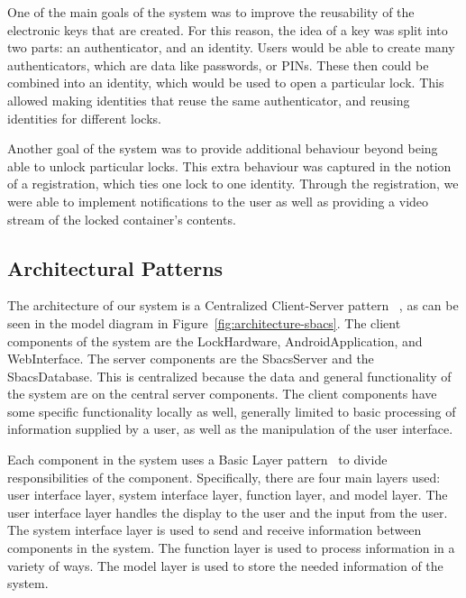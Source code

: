\documentclass[12pt]{report}
\let\Oldsubsection\subsection
\renewcommand{\subsection}{\FloatBarrier\Oldsubsection}
\begin{document}
One of the main goals of the system was to improve the reusability of the electronic keys that are created. For this
reason, the idea of a key was split into two parts: an authenticator, and an identity. Users would be able to create
many authenticators, which are data like passwords, or PINs. These then could be combined into an identity, which
would be used to open a particular lock. This allowed making identities that reuse the same authenticator, and reusing
identities for different locks.

Another goal of the system was to provide additional behaviour beyond being able to unlock particular locks.
This extra behaviour was captured in the notion of a registration, which ties one lock to one identity. Through the
registration, we were able to implement notifications to the user as well as providing a video stream of the locked 
container's contents.


\subsection{Architectural Patterns} \label{architectural-patterns}

The architecture of our system is a Centralized Client-Server pattern ~\autocite{CLIENTSERVERARCH}, as can be seen 
in the model diagram in Figure~\ref{fig:architecture-sbacs}. The client components of
the system are the LockHardware, AndroidApplication, and WebInterface. The server components are the SbacsServer and
the SbacsDatabase. This is centralized because the data and general functionality of the system are on the central
server components. The client components have some specific functionality locally as well, generally limited to
basic processing of information supplied by a user, as well as the manipulation of the user interface.

Each component in the system uses a Basic Layer pattern~\autocite{LAYERPATTERNBOOK} to divide responsibilities of the component. Specifically,
there are four main layers used: user interface layer, system interface layer, function layer, and model layer.
The user interface layer handles the display to the user and the input from the user. The system interface layer
is used to send and receive information between components in the system. The function layer is used to process
information in a variety of ways. The model layer is used to store the needed information of the system.
\end{document}
